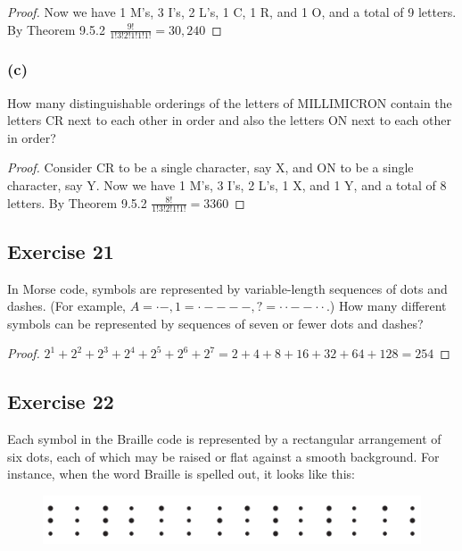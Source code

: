 \documentclass[14pt]{extarticle}
\begin{document}
\begin{proof}
Now we have 1 M's, 3 I's, 2 L's, 1 C, 1 R, and 1 O, and a total of 9 letters. By Theorem 9.5.2 
\(\frac{9!}{1!3!2!1!1!1!} = 30,240\)
\end{proof}

\subsubsection{(c)}
How many distinguishable orderings of the letters of MILLIMICRON contain the letters CR next to each other in 
order and also the letters ON next to each other in order?

\begin{proof}
Consider CR to be a single character, say X, and ON to be a single character, say Y. Now we have 1 M's, 3 I's, 2 L's, 1 X, 
and 1 Y, and a total of 8 letters. By Theorem 9.5.2 
\(\frac{8!}{1!3!2!1!1!} = 3360\)
\end{proof}

\subsection{Exercise 21}
In Morse code, symbols are represented by variable-length sequences of dots and dashes. (For example, \(A = \cdot -, 
1 = \cdot - - - -, ? = \cdot \cdot - - \cdot \cdot\).) How many different symbols can be represented by sequences of 
seven or fewer dots and dashes?

\begin{proof}
\(2^1 + 2^2 + 2^3 + 2^4 + 2^5 + 2^6 + 2^7 = 2 + 4 + 8 + 16 + 32 + 64 + 128 = 254\)
\end{proof}

\subsection{Exercise 22}
Each symbol in the Braille code is represented by a rectangular arrangement of six dots, each of which may be raised or flat against a smooth background. For instance, when the word Braille is spelled out, it looks like this:

\begin{figure}[ht!]
\centering
\includegraphics[scale=0.5]{../images/9.5.22.png}
\end{figure}
\end{document}
